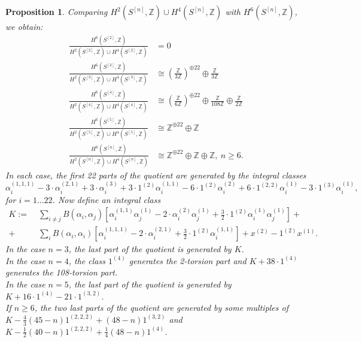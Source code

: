 \documentclass{amsart}
\newcommand{\hilb}[1]{^{[#1]}}
\newcommand{\IZ}{\mathbb{Z}}
\theoremstyle{plain}
\newtheorem{proposition}[theorem]{Proposition}
\theoremstyle{definition}
\theoremstyle{remark}
\begin{document}
\begin{proposition} Comparing $H^2(S\hilb{n},\IZ) \cup H^4(S\hilb{n},\IZ) $ with $H^6(S\hilb{n},\IZ) $, we obtain:
\begin{align} 
\frac{H^6(S\hilb{2},\IZ) }{H^2(S\hilb{2},\IZ)\cup H^4(S\hilb{2},\IZ)} &= 0 
\\
\frac{H^6(S\hilb{3},\IZ)}{H^2(S\hilb{3},\IZ)\cup H^4(S\hilb{3},\IZ)} &\cong \left(\frac{\IZ}{3\IZ}\right)^{\oplus 22} \oplus \frac{\IZ}{3\IZ}
\\
\frac{H^6(S\hilb{4},\IZ)}{H^2(S\hilb{4},\IZ)\cup H^4(S\hilb{4},\IZ)} &\cong  \left(\frac{\IZ}{6\IZ}\right)^{\oplus 22}\oplus\frac{\IZ}{108\IZ} \oplus\frac{\IZ}{2\IZ} 
\\
\frac{H^6(S\hilb{5},\IZ)}{H^2(S\hilb{5},\IZ)\cup H^4(S\hilb{5},\IZ)} &\cong 
 \IZ^{\oplus 22} \oplus \IZ
\\
\frac{H^6(S\hilb{n},\IZ)}{H^2(S\hilb{n},\IZ)\cup H^4(S\hilb{n},\IZ)} &\cong 
 \IZ^{\oplus 22} \oplus \IZ\oplus\IZ, \ n\geq 6.
\end{align}
In each case, the first 22 parts of the quotient are generated by the integral classes 
 $$
\alpha_i^{(1,1,1)} -3\cdot \alpha_i^{(2,1)} + 3\cdot \alpha_i^{(3)}+ 3 \cdot 1^{(2)}\alpha_i^{(1,1)} -6\cdot 1^{(2)}\alpha_i^{(2)}+6\cdot 1^{(2,2)}\alpha_i^{(1)}-3\cdot 1^{(3)}\alpha_i^{(1)},
$$ 
for $ i=1\ldots 22$. Now define an integral class
\begin{align*}
K:=&\;\sum_{i\neq j} B(\alpha_i,\alpha_j)\left[\alpha_i^{(1,1)}\alpha_j^{(1)} - 2\cdot\alpha_i^{(2)}\alpha_j^{(1)}+\frac{3}{2}\cdot 1^{(2)}\alpha_i^{(1)}\alpha_j^{(1)} \right] +\\
+&\;\sum_{i}B(\alpha_i,\alpha_i)\left[\alpha_i^{(1,1,1)} - 2\cdot\alpha_i^{(2,1)} + \frac{3}{2}\cdot 1^{(2)}\alpha_i^{(1,1)} \right]+  x^{(2)}-1^{(2)}x^{(1)}.
\end{align*} 
In the case $n=3$, the last part of the quotient is generated by $K$. 
\\In the case $n=4$, the class $ 1^{(4)}$ generates the 2-torsion part and $K+38\cdot1^{(4)}$ generates the 108-torsion part.
\\In the case $n=5$, the last part of the quotient is generated by $K + 16\cdot 1^{(4)} - 21\cdot 1^{(3,2)}$.\\
If $n\geq 6$, the two last parts of the quotient are generated by some multiples of $K -\frac{4}{3}(45-n)1^{(2,2,2)} + (48-n)1^{(3,2)}$ and $K-\frac{1}{2}(40-n)1^{(2,2,2)}+ \frac{1}{4}(48-n)1^{(4)}$.
\end{proposition}




\end{document}

